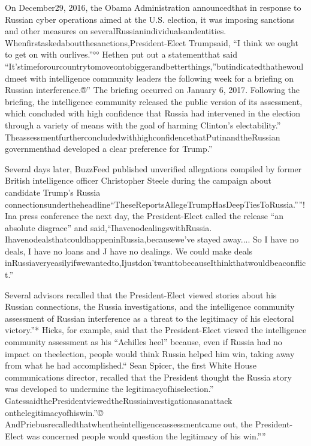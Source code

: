 On December29, 2016, the Obama Administration announcedthat in response to Russian cyber operations aimed at the U.S. election, it was imposing sanctions and other measures on severalRussianindividualsandentities.
Whenfirstaskedaboutthesanctions,President-Elect Trumpsaid, “I think we ought to get on with ourlives.”°°
Hethen put out a statementthat said “It’stimeforourcountrytomoveontobiggerandbetterthings,”butindicatedthathewouldmeet with intelligence community leaders the following week for a briefing on Russian interference.®”
The briefing occurred on January 6, 2017.
Following the briefing, the intelligence community released the public version of its assessment, which concluded with high confidence that Russia had intervened in the election through a variety of means with the goal of harming Clinton’s electability.”
TheassessmentfurtherconcludedwithhighconfidencethatPutinandtheRussian governmenthad developed a clear preference for Trump.”

Several days later, BuzzFeed published unverified allegations compiled by former British intelligence officer Christopher Steele during the campaign about candidate Trump’s Russia connectionsundertheheadline“TheseReportsAllegeTrumpHasDeepTiesToRussia.””!
Ina press conference the next day, the President-Elect called the release “an absolute disgrace” and said,“IhavenodealingswithRussia.
IhavenodealsthatcouldhappeninRussia,becausewe’ve stayed away....
So I have no deals, I have no loans and J have no dealings.
We could make deals inRussiaveryeasilyifwewantedto,Ijustdon’twanttobecauseIthinkthatwouldbeaconflict.”

Several advisors recalled that the President-Elect viewed stories about his Russian connections, the Russia investigations, and the intelligence community assessment of Russian interference as a threat to the legitimacy of his electoral victory.”*
Hicks, for example, said that the President-Elect viewed the intelligence community assessment as his “Achilles heel” because, even if Russia had no impact on theelection, people would think Russia helped him win, taking away from what he had accomplished.“
Sean Spicer, the first White House communications director, recalled that the President thought the Russia story was developed to undermine the legitimacyofhiselection.”
GatessaidthePresidentviewedtheRussiainvestigationasanattack onthelegitimacyofhiswin.”©
AndPriebusrecalledthatwhentheintelligenceassessmentcame out, the President-Elect was concerned people would question the legitimacy of his win.””

